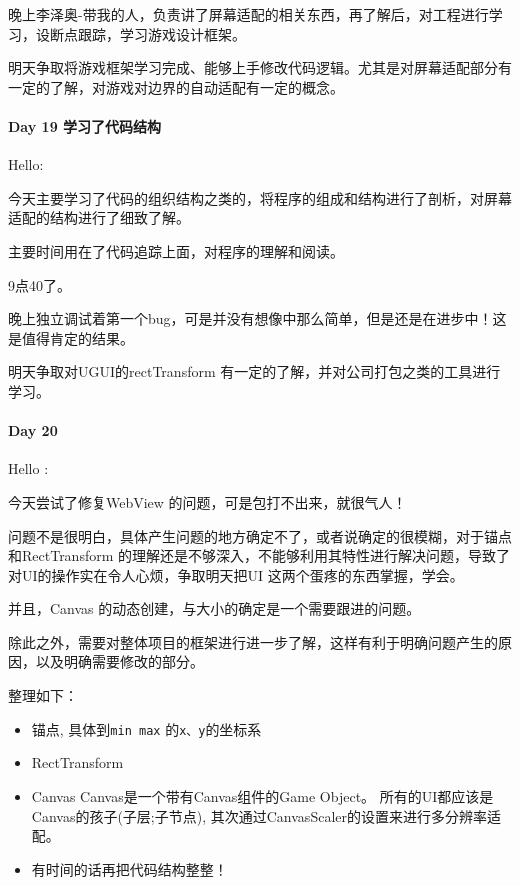 \documentclass[UTF8,a4paper,8pt]{ctexart}
\begin{document}
 	 	晚上李泽奥-带我的人，负责讲了屏幕适配的相关东西，再了解后，对工程进行学习，设断点跟踪，学习游戏设计框架。
 	 	
 	 	明天争取将游戏框架学习完成、能够上手修改代码逻辑。尤其是对屏幕适配部分有一定的了解，对游戏对边界的自动适配有一定的概念。
 	 	
 	 \paragraph{Day 19   学习了代码结构   \quad     }
 	 	Hello:
 	 	
 	 	今天主要学习了代码的组织结构之类的，将程序的组成和结构进行了剖析，对屏幕适配的结构进行了细致了解。
 	 	
 	 	主要时间用在了代码追踪上面，对程序的理解和阅读。
 	 	
 	 	9点40了。
 	 	
 	 	晚上独立调试着第一个bug，可是并没有想像中那么简单，但是还是在进步中！这是值得肯定的结果。
 	 	
 	 	明天争取对UGUI的rectTransform 有一定的了解，并对公司打包之类的工具进行学习。
 	 	
 	 \paragraph{Day 20      \quad     }
 	 	Hello :
 	 	
 	 	今天尝试了修复WebView 的问题，可是包打不出来，就很气人！
 	 	
 	 	问题不是很明白，具体产生问题的地方确定不了，或者说确定的很模糊，对于锚点和RectTransform 的理解还是不够深入，不能够利用其特性进行解决问题，导致了对UI的操作实在令人心烦，争取明天把UI 这两个蛋疼的东西掌握，学会。
 	 	
 	 	并且，Canvas 的动态创建，与大小的确定是一个需要跟进的问题。
 	 	
 	 	除此之外，需要对整体项目的框架进行进一步了解，这样有利于明确问题产生的原因，以及明确需要修改的部分。
 	 	
 	 		整理如下：
 	 			\begin{itemize}
 	 				\item 锚点, 具体到\verb|min max| 的\verb|x、y|的坐标系
 	 				\item RectTransform
 	 				\item Canvas Canvas是一个带有Canvas组件的Game Object。
 	 				所有的UI都应该是Canvas的孩子(子层;子节点), 其次通过CanvasScaler的设置来进行多分辨率适配。
 	 				\item 有时间的话再把代码结构整整！
 	 			\end{itemize}
 	 	
\end{document}
